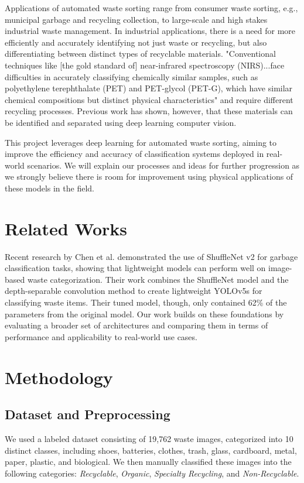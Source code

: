 \documentclass[11pt,twocolumn]{article}
\begin{document}
Applications of automated waste sorting range from consumer waste sorting, e.g., municipal garbage and recycling collection, to large-scale and high stakes industrial waste management. In industrial applications, there is a need for more efficiently and accurately identifying not just waste or recycling, but also differentiating between distinct types of recyclable materials. "Conventional techniques like [the gold standard of] near-infrared spectroscopy (NIRS)...face difficulties in accurately classifying chemically similar samples, such as polyethylene terephthalate (PET) and PET-glycol (PET-G), which have similar chemical compositions but distinct physical characteristics" \cite{choi2023} and require different recycling processes. Previous work has shown, however, that these materials can be identified and separated using deep learning computer vision.

This project leverages deep learning for automated waste sorting, aiming to improve the efficiency and accuracy of classification systems deployed in real-world scenarios. We will explain our processes and ideas for further progression as we strongly believe there is room for improvement using physical applications of these models in the field. 

\section{Related Works}
\label{sec:background}
Recent research by Chen et al. \cite{chen2023} demonstrated the use of ShuffleNet v2 for garbage classification tasks, showing that lightweight models can perform well on image-based waste categorization. Their work combines the ShuffleNet model and the depth-separable convolution method to create lightweight YOLOv5s for classifying waste items. Their tuned model, though, only contained 62\% of the parameters from the original model. Our work builds on these foundations by evaluating a broader set of architectures and comparing them in terms of performance and applicability to real-world use cases.


\section{Methodology}
\label{sec:methodology}

\subsection{Dataset and Preprocessing}
We used a labeled dataset consisting of 19,762 waste images, categorized into 10 distinct classes, including shoes, batteries, clothes, trash, glass, cardboard, metal, paper, plastic, and biological. We then manually classified these images into the following categories: \textit{Recyclable}, \textit{Organic}, \textit{Specialty Recycling}, and \textit{Non-Recyclable}.
\vspace{0.1cm}
\end{document}
